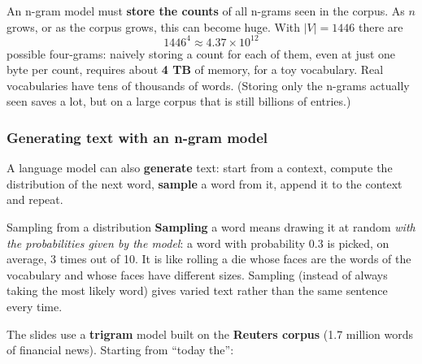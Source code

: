 An n-gram model must \textbf{store the counts} of all n-grams seen in the corpus. As $n$
grows, or as the corpus grows, this can become huge. With $|V| = 1446$ there are
\[
  1446^4 \approx 4.37 \times 10^{12}
\]
possible four-grams: naively storing a count for each of them, even at just one byte per
count, requires about \textbf{4 TB} of memory, for a toy vocabulary. Real vocabularies
have tens of thousands of words. (Storing only the n-grams actually seen saves a lot,
but on a large corpus that is still billions of entries.)

\subsubsection{Generating text with an n-gram model}

A language model can also \textbf{generate} text: start from a context, compute the
distribution of the next word, \textbf{sample} a word from it, append it to the context
and repeat.

\begin{nbdef}{Sampling from a distribution}
\notinslides
\textbf{Sampling} a word means drawing it at random \emph{with the probabilities given
by the model}: a word with probability 0.3 is picked, on average, 3 times out of 10. It
is like rolling a die whose faces are the words of the vocabulary and whose faces have
different sizes. Sampling (instead of always taking the most likely word) gives varied
text rather than the same sentence every time.
\end{nbdef}

The slides use a \textbf{trigram} model built on the \textbf{Reuters corpus} (1.7
million words of financial news). Starting from ``today the'':

\begin{center}
\end{center}

